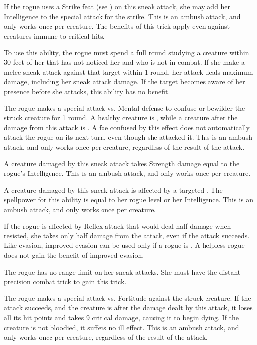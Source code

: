If the rogue uses a Strike feat (see ) on this sneak attack, she may add her Intelligence to the special attack for the strike.
This is an ambush attack, and only works once per creature.
The benefits of this trick apply even against creatures immune to critical hits.

To use this ability, the rogue must spend a full round studying a creature within 30 feet of her that has not noticed her and who is not in combat.
If she make a melee sneak attack against that target within 1 round, her attack deals maximum damage, including her sneak attack damage.
If the target becomes aware of her presence before she attacks, this ability has no benefit.

The rogue makes a special attack vs. Mental defense to confuse or bewilder the struck creature for 1 round.
A healthy creature is \bewildered, while a creature \bloodied after the damage from this attack is \confused.
A foe confused by this effect does not automatically attack the rogue on its next turn, even though she attacked it.
This is an ambush attack, and only works once per creature, regardless of the result of the attack.

A creature damaged by this sneak attack takes Strength damage equal to the rogue's Intelligence.
This is an ambush attack, and only works once per creature.

A creature damaged by this sneak attack is affected by a targeted .
The spellpower for this ability is equal to her rogue level or her Intelligence.
This is an ambush attack, and only works once per creature.

If the rogue is affected by Reflex attack that would deal half damage when resisted, she takes only half damage from the attack, even if the attack succeeds.
Like evasion, improved evasion can be used only if a rogue is \unencumbered.
A helpless rogue does not gain the benefit of improved evasion.

The rogue has no range limit on her sneak attacks.
She must have the distant precision combat trick to gain this trick.

The rogue makes a special attack vs. Fortitude against the struck creature.
If the attack succeeds, and the creature is \bloodied after the damage dealt by this attack, it loses all its hit points and takes 9 critical damage, causing it to begin dying.
If the creature is not bloodied, it suffers no ill effect.
This is an ambush attack, and only works once per creature, regardless of the result of the attack.

